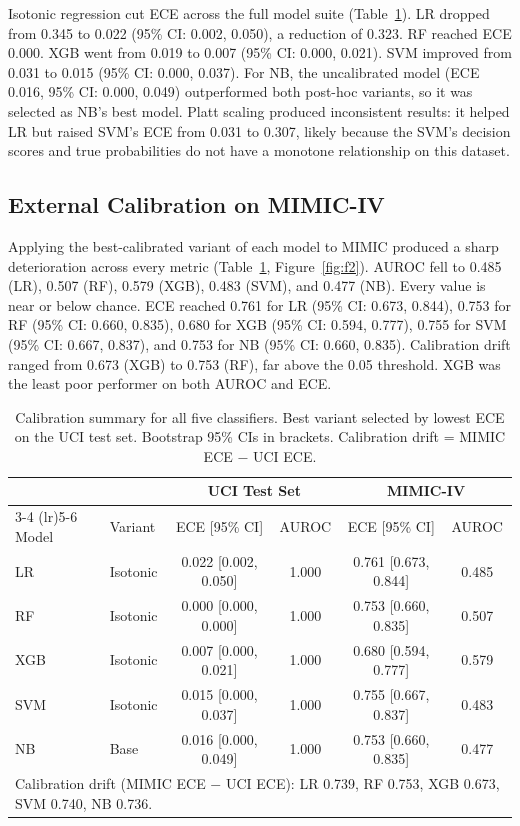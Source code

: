 Isotonic regression cut ECE across the full model suite (Table~\ref{tab:t2}). LR dropped from 0.345 to 0.022 (95\% CI: 0.002, 0.050), a reduction of 0.323. RF reached ECE 0.000. XGB went from 0.019 to 0.007 (95\% CI: 0.000, 0.021). SVM improved from 0.031 to 0.015 (95\% CI: 0.000, 0.037). For NB, the uncalibrated model (ECE 0.016, 95\% CI: 0.000, 0.049) outperformed both post-hoc variants, so it was selected as NB's best model. Platt scaling produced inconsistent results: it helped LR but raised SVM's ECE from 0.031 to 0.307, likely because the SVM's decision scores and true probabilities do not have a monotone relationship on this dataset.

\subsection{External Calibration on MIMIC-IV}

Applying the best-calibrated variant of each model to MIMIC produced a sharp deterioration across every metric (Table~\ref{tab:t2}, Figure~\ref{fig:f2}). AUROC fell to 0.485 (LR), 0.507 (RF), 0.579 (XGB), 0.483 (SVM), and 0.477 (NB). Every value is near or below chance. ECE reached 0.761 for LR (95\% CI: 0.673, 0.844), 0.753 for RF (95\% CI: 0.660, 0.835), 0.680 for XGB (95\% CI: 0.594, 0.777), 0.755 for SVM (95\% CI: 0.667, 0.837), and 0.753 for NB (95\% CI: 0.660, 0.835). Calibration drift ranged from 0.673 (XGB) to 0.753 (RF), far above the 0.05 threshold. XGB was the least poor performer on both AUROC and ECE.

\begin{table}[ht]
\centering
\caption{Calibration summary for all five classifiers. Best variant selected by lowest ECE on the UCI test set. Bootstrap 95\% CIs in brackets. Calibration drift = MIMIC ECE $-$ UCI ECE.}
\label{tab:t2}
\begin{tabular}{llcccc}
\toprule
 & & \multicolumn{2}{c}{UCI Test Set} & \multicolumn{2}{c}{MIMIC-IV} \\
\cmidrule(lr){3-4} \cmidrule(lr){5-6}
Model & Variant & ECE [95\% CI] & AUROC & ECE [95\% CI] & AUROC \\
\midrule
LR  & Isotonic & 0.022 [0.002, 0.050] & 1.000 & 0.761 [0.673, 0.844] & 0.485 \\
RF  & Isotonic & 0.000 [0.000, 0.000] & 1.000 & 0.753 [0.660, 0.835] & 0.507 \\
XGB & Isotonic & 0.007 [0.000, 0.021] & 1.000 & 0.680 [0.594, 0.777] & 0.579 \\
SVM & Isotonic & 0.015 [0.000, 0.037] & 1.000 & 0.755 [0.667, 0.837] & 0.483 \\
NB  & Base     & 0.016 [0.000, 0.049] & 1.000 & 0.753 [0.660, 0.835] & 0.477 \\
\midrule
\multicolumn{6}{l}{\footnotesize Calibration drift (MIMIC ECE $-$ UCI ECE): LR 0.739, RF 0.753, XGB 0.673, SVM 0.740, NB 0.736.}\\
\bottomrule
\end{tabular}
\end{table}

